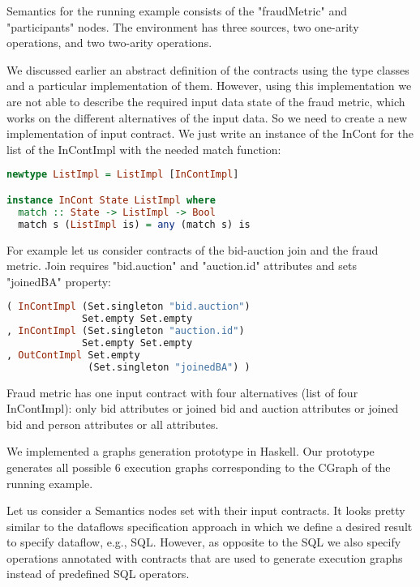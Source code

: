 Semantics for the running example consists of the "fraudMetric" and "participants" nodes.
The environment has three sources, two one-arity operations, and two two-arity operations.

We discussed earlier an abstract definition of the contracts using the type classes and a particular implementation of them. 
However, using this implementation we are not able to describe the required input data state of the fraud metric, which works on the different alternatives of the input data.
So we need to create a new implementation of input contract.
We just write an instance of the InCont for the list of the InContImpl with the needed match function:

\begin{lstlisting}[language=Haskell]
newtype ListImpl = ListImpl [InContImpl]

instance InCont State ListImpl where
  match :: State -> ListImpl -> Bool
  match s (ListImpl is) = any (match s) is
\end{lstlisting}

For example let us consider contracts of the bid-auction join and the fraud metric.
Join requires "bid.auction" and "auction.id" attributes and sets "joinedBA" property:
\begin{lstlisting}[language=Haskell]
( InContImpl (Set.singleton "bid.auction")
             Set.empty Set.empty
, InContImpl (Set.singleton "auction.id")
             Set.empty Set.empty
, OutContImpl Set.empty
              (Set.singleton "joinedBA") )
\end{lstlisting}

Fraud metric has one input contract with four alternatives (list of four InContImpl):
only bid attributes
or joined bid and auction attributes
or joined bid and person attributes
or all attributes.

We implemented a graphs generation prototype in Haskell.
Our prototype generates all possible 6 execution graphs corresponding to the CGraph of the running example.

Let us consider a Semantics nodes set with their input contracts.
It looks pretty similar to the dataflows specification approach in which we define a desired result to specify dataflow, e.g., SQL.
However, as opposite to the SQL we also specify operations annotated with contracts that are used to generate execution graphs instead of predefined SQL operators.
